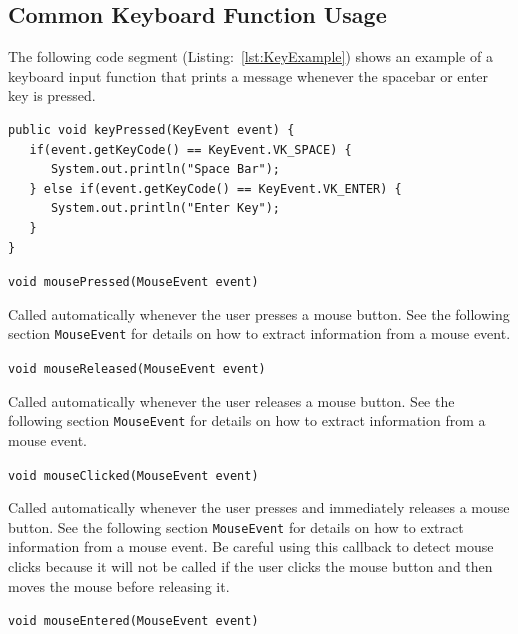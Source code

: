 \documentclass[a4paper, 10pt]{report}
\begin{document}
\subsection*{Common Keyboard Function Usage} \nonumber

The following code segment (Listing:~\ref{lst:KeyExample}) shows an example of a keyboard input function that prints a message whenever the spacebar or enter key is pressed.

\vspace{1em}
\begin{lstlisting}[caption=Example use of the keyPressed function and the KeyEvent., label=lst:KeyExample]
public void keyPressed(KeyEvent event) {
   if(event.getKeyCode() == KeyEvent.VK_SPACE) {
      System.out.println("Space Bar");
   } else if(event.getKeyCode() == KeyEvent.VK_ENTER) {
      System.out.println("Enter Key");
   }
}
\end{lstlisting}

\hrulefill

\vspace{1em}

{\large {\tt void mousePressed(MouseEvent event)}}

Called automatically whenever the user presses a mouse button. See the following section {\tt MouseEvent} for details on how to extract information from a mouse event.

\hrulefill

{\large {\tt void mouseReleased(MouseEvent event)}}

Called automatically whenever the user releases a mouse button. See the following section {\tt MouseEvent} for details on how to extract information from a mouse event.

\hrulefill

{\large {\tt void mouseClicked(MouseEvent event)}}

Called automatically whenever the user presses and immediately releases a mouse button. See the following section {\tt MouseEvent} for details on how to extract information from a mouse event. Be careful using this callback to detect mouse clicks because it will not be called if the user clicks the mouse button and then moves the mouse before releasing it. 

\hrulefill

{\large {\tt void mouseEntered(MouseEvent event)}}
\end{document}
